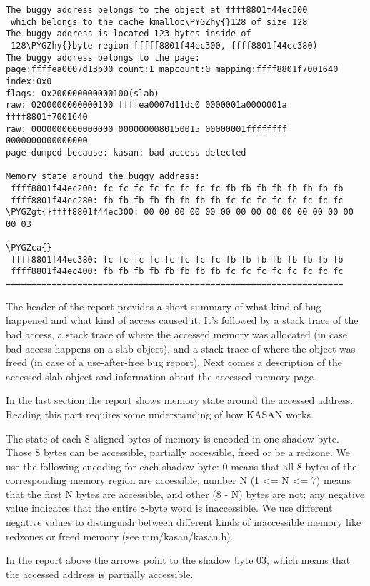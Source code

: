 \documentclass[a4paper,8pt,english]{sphinxmanual}
\def\PYGZca{\char`\^}
\def\PYGZgt{\char`\>}
\def\PYGZhy{\char`\-}
\begin{document}
\begin{Verbatim}[commandchars=\\\{\}]
The buggy address belongs to the object at ffff8801f44ec300
 which belongs to the cache kmalloc\PYGZhy{}128 of size 128
The buggy address is located 123 bytes inside of
 128\PYGZhy{}byte region [ffff8801f44ec300, ffff8801f44ec380)
The buggy address belongs to the page:
page:ffffea0007d13b00 count:1 mapcount:0 mapping:ffff8801f7001640 index:0x0
flags: 0x200000000000100(slab)
raw: 0200000000000100 ffffea0007d11dc0 0000001a0000001a ffff8801f7001640
raw: 0000000000000000 0000000080150015 00000001ffffffff 0000000000000000
page dumped because: kasan: bad access detected

Memory state around the buggy address:
 ffff8801f44ec200: fc fc fc fc fc fc fc fc fb fb fb fb fb fb fb fb
 ffff8801f44ec280: fb fb fb fb fb fb fb fb fc fc fc fc fc fc fc fc
\PYGZgt{}ffff8801f44ec300: 00 00 00 00 00 00 00 00 00 00 00 00 00 00 00 03
                                                                \PYGZca{}
 ffff8801f44ec380: fc fc fc fc fc fc fc fc fb fb fb fb fb fb fb fb
 ffff8801f44ec400: fb fb fb fb fb fb fb fb fc fc fc fc fc fc fc fc
==================================================================
\end{Verbatim}

The header of the report provides a short summary of what kind of bug happened
and what kind of access caused it. It's followed by a stack trace of the bad
access, a stack trace of where the accessed memory was allocated (in case bad
access happens on a slab object), and a stack trace of where the object was
freed (in case of a use-after-free bug report). Next comes a description of
the accessed slab object and information about the accessed memory page.

In the last section the report shows memory state around the accessed address.
Reading this part requires some understanding of how KASAN works.

The state of each 8 aligned bytes of memory is encoded in one shadow byte.
Those 8 bytes can be accessible, partially accessible, freed or be a redzone.
We use the following encoding for each shadow byte: 0 means that all 8 bytes
of the corresponding memory region are accessible; number N (1 \textless{}= N \textless{}= 7) means
that the first N bytes are accessible, and other (8 - N) bytes are not;
any negative value indicates that the entire 8-byte word is inaccessible.
We use different negative values to distinguish between different kinds of
inaccessible memory like redzones or freed memory (see mm/kasan/kasan.h).

In the report above the arrows point to the shadow byte 03, which means that
the accessed address is partially accessible.
\end{document}
